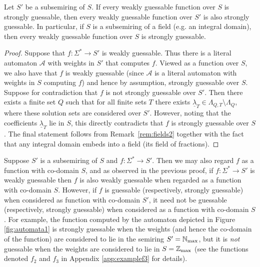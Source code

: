 \documentclass{lmcs}
\numberwithin{theorem}{section}
\begin{document}
		\begin{lem}
			\label{prop:subsemiring}
			Let $S'$ be a subsemiring of $S$. If every weakly guessable function over $S$ is strongly guessable, then every weakly guessable function over $S'$ is also strongly guessable.
   In particular, if $S$ is a subsemiring of a field (e.g. an integral domain), then every weakly guessable function over $S$ is strongly guessable.
		\end{lem}
	
		\begin{proof}
	Suppose that $f: \Sigma^* \rightarrow S'$ is weakly guessable. Thus there is a literal automaton $\mathcal{A}$ with weights in $S'$ that computes $f$. Viewed as a function over $S$, we also have that $f$ is weakly guessable (since $\mathcal{A}$ is a literal automaton with weights in $S$ computing $f$) and hence by assumption, strongly guessable over $S$. Suppose for contradiction that $f$ is not strongly guessable over $S'$. Then there exists a finite set $Q$ such that for all finite sets $T$ there exists $\underline{\lambda}_T \in \Lambda_{Q, T} \setminus \Lambda_Q$, where these solution sets are considered over $S'$. However, noting that the coefficients $\underline{\lambda}_T$ lie in $S$, this directly contradicts that $f$ is strongly guessable over $S$. The final statement follows from Remark~\ref{rem:fields2} together with the fact that any integral domain embeds into a field (its field of fractions).
\end{proof}	

\begin{rem}
Suppose $S'$ is a subsemiring of $S$ and $f: \Sigma^* \rightarrow S'$. Then we may also regard $f$ as a function with co-domain $S$, and as observed in the previous proof, if $f: \Sigma^* \rightarrow S'$ is weakly guessable then $f$ is also weakly guessable when regarded as a function with co-domain $S$. However, if $f$ is guessable (respectively, strongly guessable) when considered as function with co-domain $S'$, it need not be guessable (respectively, strongly guessable) when considered as a function with co-domain $S$. For example, the function computed by the automaton depicted in Figure \ref{fig:automata1} is strongly guessable when the weights (and hence the co-domain of the function) are considered to lie in the semiring $S'=\mathbb{N}_{\rm max}$, but it is \emph{not} guessable when the weights are considered to lie in $S=\mathbb{Z}_{\rm max}$ (see the functions denoted $f_2$ and $f_3$ in Appendix \ref{app:examplef3} for details). 
\end{rem}
\end{document}
